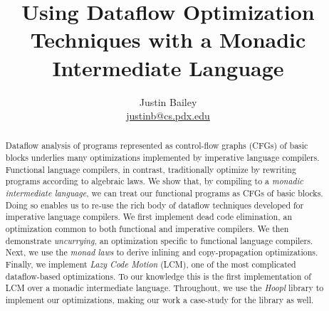 \documentclass[12pt]{article}
\begin{document}


\newcommand{\authorEmail}{\url{justinb@cs.pdx.edu}}
%
           {\newcommand{\authorEmail}{\url{justinb@@cs.pdx.edu}}}%
           {}

\date{}
\author{Justin Bailey \\ \authorEmail}
\title{Using Dataflow Optimization Techniques with a Monadic Intermediate Language}

\maketitle 
\ifthenelse{\standaloneFlag}
           {\thispagestyle{empty}}
           {}

\renewcommand{\abstractnamefont}{\normalfont\small\sffamily\bfseries}
\begin{abstract}
  Dataflow analysis of programs represented as control-flow graphs
  (CFGs) of basic blocks underlies many optimizations implemented by
  imperative language compilers. Functional language compilers, in
  contrast, traditionally optimize by rewriting programs according to
  algebraic laws. We show that, by compiling to a \emph{monadic
    intermediate language}, we can treat our functional programs as
  CFGs of basic blocks. Doing so enables us to re-use the rich body of
  dataflow techniques developed for imperative language compilers. We
  first implement dead code elimination, an optimization common to
  both functional and imperative compilers. We then demonstrate
  \emph{uncurrying}, an optimization specific to functional language
  compilers. Next, we use the \emph{monad laws} to derive inlining and
  copy-propagation optimizations. Finally, we implement \emph{Lazy
    Code Motion} (LCM), one of the most complicated dataflow-based
  optimizations. To our knowledge this is the first implementation of
  LCM over a monadic intermediate language. Throughout, we use the
  \emph{Hoopl} library to implement our optimizations, making our work
  a case-study for the library as well.
\end{abstract}
\end{document}
